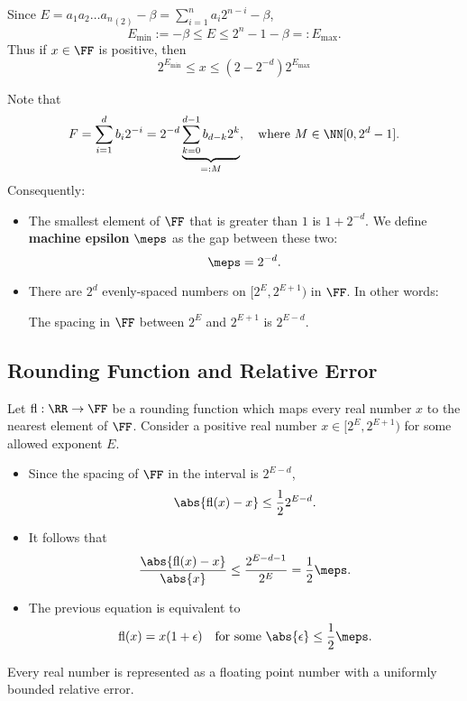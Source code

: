 \documentclass[]{ximera}
\begin{document}
Since $E = a_1 a_2 \ldots {a_n}_{(2)} - \beta = \sum_{i=1}^n a_i 2^{n-i} - \beta$,
\[
E_{\text{min}} := -\beta \le E \le 2^n - 1 - \beta =: E_{\text{max}}.
\]
Thus if $x \in \FF$ is positive, then
\[
2^{E_\text{min}} \le x \le (2-2^{-d})2^{E_\text{max}}
\]

Note that
\[
F = \sum_{i=1}^{d} b_i 2^{-i} = 2^{-d} \underbrace{\sum_{k=0}^{d-1} b_{d-k} 2^k}_{=:M},
\quad \text{where } M \in \NN[0, 2^d - 1].
\]
Consequently:

\begin{itemize}
\item The smallest element of $\FF$ that is greater than $1$ is $1 + 2^{-d}$. We define \textbf{machine epsilon} $\meps$ as the gap between these two:
\[
   \meps = 2^{-d}.
   \]
\item There are $2^d$ evenly-spaced numbers on $[2^E, 2^{E+1})$ in $\FF$. In other words:
\vs
\begin{center}
\begin{tcolorbox}[width=0.8\linewidth,arc=0mm,boxrule=0.7pt,colback=white,nobeforeafter]
The spacing in $\FF$ between $2^E$ and $2^{E+1}$ is $2^{E-d}$.
\end{tcolorbox}
\end{center}
\end{itemize}

\subsection{Rounding Function and Relative Error}
Let $\text{fl}:\RR \to \FF$ be a rounding function which maps every real number $x$ to the nearest element of $\FF$. Consider a positive real number $x \in [2^E, 2^{E+1})$ for some allowed exponent $E$.
\begin{itemize}
\item Since the spacing of $\FF$ in the interval is $2^{E-d}$,
\[
   \abs{ \text{fl}(x) - x } \le \frac{1}{2} 2^{E - d}.
   \]
\item It follows that
\[
   \frac{ \abs{\text{fl}(x) - x} }{ \abs{x} } \le \frac{2^{E-d-1}}{2^E} = \frac{1}{2} \meps.
   \]
\item The previous equation is equivalent to
\[
   \text{fl}(x) = x(1+\epsilon) \quad\text{for some } \abs{\epsilon} \le \frac{1}{2} \meps.
   \]
\end{itemize}

\begin{center}
\begin{tcolorbox}[width=0.8\linewidth,arc=0mm,boxrule=0.7pt,colback=white,nobeforeafter]
Every real number is represented as a floating point number with a uniformly bounded relative error.
\end{tcolorbox}
\end{center}
\end{document}
